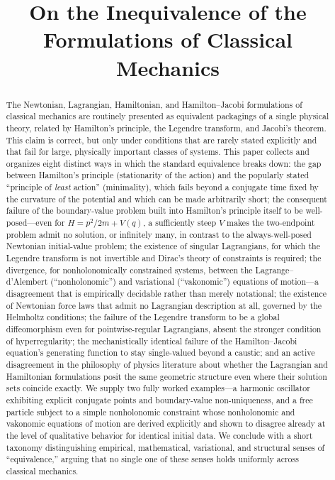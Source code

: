 \documentclass[11pt]{article}
\title{On the Inequivalence of the Formulations of Classical Mechanics}
\author{}
\date{}
\begin{document}
\maketitle

\begin{abstract}
\noindent
The Newtonian, Lagrangian, Hamiltonian, and Hamilton--Jacobi formulations of classical mechanics are routinely presented as equivalent packagings of a single physical theory, related by Hamilton's principle, the Legendre transform, and Jacobi's theorem. This claim is correct, but only under conditions that are rarely stated explicitly and that fail for large, physically important classes of systems. This paper collects and organizes eight distinct ways in which the standard equivalence breaks down: the gap between Hamilton's principle (stationarity of the action) and the popularly stated ``principle of \emph{least} action'' (minimality), which fails beyond a conjugate time fixed by the curvature of the potential and which can be made arbitrarily short; the consequent failure of the boundary-value problem built into Hamilton's principle itself to be well-posed---even for $H=p^2/2m+V(q)$, a sufficiently steep $V$ makes the two-endpoint problem admit no solution, or infinitely many, in contrast to the always-well-posed Newtonian initial-value problem; the existence of singular Lagrangians, for which the Legendre transform is not invertible and Dirac's theory of constraints is required; the divergence, for nonholonomically constrained systems, between the Lagrange--d'Alembert (``nonholonomic'') and variational (``vakonomic'') equations of motion---a disagreement that is empirically decidable rather than merely notational; the existence of Newtonian force laws that admit no Lagrangian description at all, governed by the Helmholtz conditions; the failure of the Legendre transform to be a global diffeomorphism even for pointwise-regular Lagrangians, absent the stronger condition of hyperregularity; the mechanistically identical failure of the Hamilton--Jacobi equation's generating function to stay single-valued beyond a caustic; and an active disagreement in the philosophy of physics literature about whether the Lagrangian and Hamiltonian formulations posit the same geometric structure even where their solution sets coincide exactly. We supply two fully worked examples---a harmonic oscillator exhibiting explicit conjugate points and boundary-value non-uniqueness, and a free particle subject to a simple nonholonomic constraint whose nonholonomic and vakonomic equations of motion are derived explicitly and shown to disagree already at the level of qualitative behavior for identical initial data. We conclude with a short taxonomy distinguishing empirical, mathematical, variational, and structural senses of ``equivalence,'' arguing that no single one of these senses holds uniformly across classical mechanics.
\end{abstract}
\end{document}
